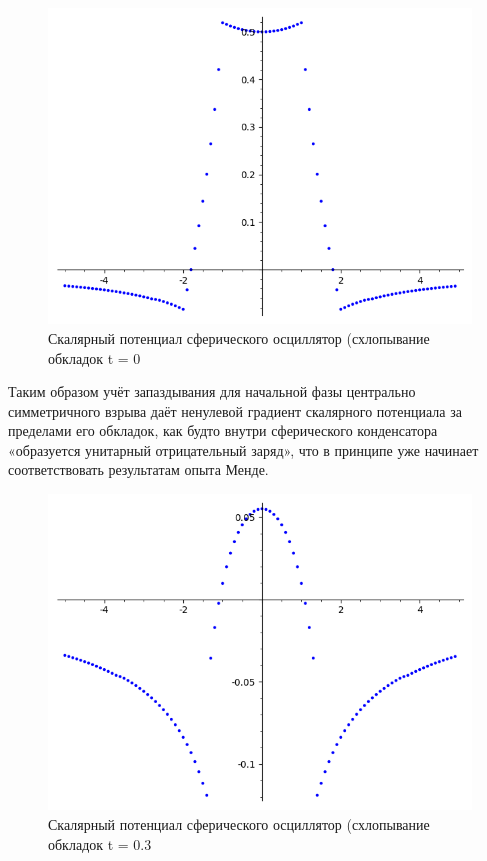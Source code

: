 \documentclass[12pt]{article}
\begin{document}
\begin{figure}
    \centering
    \includegraphics[scale=0.3]{spherical_oscillator_phi_Rneg=2_Rpos=1_v0neg=-2_v0pos=1_a0neg=0_a0pos=0c=3_t=0}
    \caption{Скалярный потенциал сферического осциллятор (схлопывание обкладок t = 0}
    \label{fig:spherical_oscillator_phi_Rneg=2_Rpos=1_v0neg=-2_v0pos=1_a0neg=0_a0pos=0c=3_t=0}
\end{figure}

Таким образом учёт запаздывания для начальной фазы центрально симметричного взрыва даёт ненулевой градиент скалярного потенциала за пределами его обкладок, как будто внутри сферического конденсатора «образуется унитарный отрицательный заряд», что в принципе уже начинает соответствовать результатам опыта Менде.

\begin{figure}
    \centering
    \includegraphics[scale=0.3]{spherical_oscillator_phi_Rneg=2_Rpos=1_v0neg=-2_v0pos=1_a0neg=0_a0pos=0c=3_t=0_3}
    \caption{Скалярный потенциал сферического осциллятор (схлопывание обкладок t = 0.3}
    \label{fig:spherical_oscillator_phi_Rneg=2_Rpos=1_v0neg=-2_v0pos=1_a0neg=0_a0pos=0c=3_t=0_3}
\end{figure}
\end{document}
